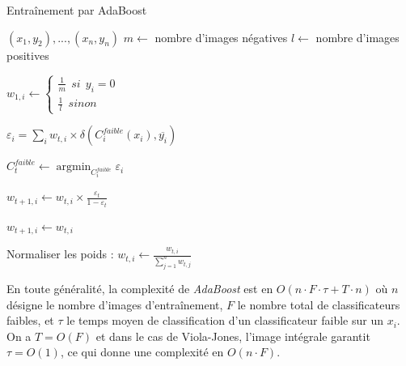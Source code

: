 \documentclass[12pt,a4paper]{article}
\DeclareMathOperator*{\argmin}{argmin}
\begin{document}
\begin{algorithm}[H]
    \caption{Entraînement par AdaBoost}
    \begin{algorithmic}
        \Input

        $(x_1, y_2), ..., (x_n, y_n)$
        \EndInput
        \State $m \gets$ nombre d'images négatives
        \State $l \gets$ nombre d'images positives
         

            \State $w_{1, i} \gets \begin{cases}
                \frac{1}{m} \:\: si \:\: y_i = 0 \\
                \frac{1}{l} \:\: sinon
                \end{cases}$
        \EndFor


                \State $\varepsilon_i = \sum_i w_{t,i} \times \delta(C_i^{faible}(x_i), \overline{y_i})$ 
            \EndFor

            \State $C_t^{faible} \gets \argmin_{C_i^{faible}} \varepsilon_i$
             

                \State $w_{t+1, i} \gets w_{t, i} \times \frac{\varepsilon_t}{1- \varepsilon_t}$ 

            \Else
                \State $w_{t+1, i} \gets w_{t, i}$ 
            \EndIf

            \EndFor
            \State Normaliser les poids : $w_{t, i} \gets \frac{w_{t, i}}{\sum_{j=1}^n w_{t, j}}$
        \EndFor
    \end{algorithmic}
\end{algorithm}

En toute généralité, la complexité de \textit{AdaBoost} est en $O(n \cdot F \cdot \tau + T \cdot n)$ où $n$ désigne le nombre d'images d'entraînement, $F$ le nombre total de classificateurs faibles, et $\tau$ le temps moyen de classification d'un classificateur faible sur un $x_i$. On a $T = O(F)$ et dans le cas de Viola-Jones, l'image intégrale garantit $\tau = O(1)$, ce qui donne une complexité en $O(n \cdot F)$.
\end{document}
